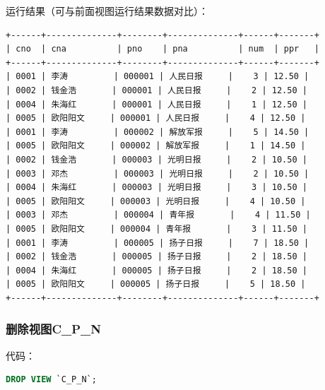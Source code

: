 \documentclass[hyperref,UTF8,c5size]{ctexart}
\begin{document}
            运行结果（可与前面视图运行结果数据对比）：
            \begin{lstlisting}
+------+--------------+--------+--------------+------+-------+
| cno  | cna          | pno    | pna          | num  | ppr   |
+------+--------------+--------+--------------+------+-------+
| 0001 | 李涛         | 000001 | 人民日报     |    3 | 12.50 |
| 0002 | 钱金浩       | 000001 | 人民日报     |    2 | 12.50 |
| 0004 | 朱海红       | 000001 | 人民日报     |    1 | 12.50 |
| 0005 | 欧阳阳文     | 000001 | 人民日报     |    4 | 12.50 |
| 0001 | 李涛         | 000002 | 解放军报     |    5 | 14.50 |
| 0005 | 欧阳阳文     | 000002 | 解放军报     |    1 | 14.50 |
| 0002 | 钱金浩       | 000003 | 光明日报     |    2 | 10.50 |
| 0003 | 邓杰         | 000003 | 光明日报     |    2 | 10.50 |
| 0004 | 朱海红       | 000003 | 光明日报     |    3 | 10.50 |
| 0005 | 欧阳阳文     | 000003 | 光明日报     |    4 | 10.50 |
| 0003 | 邓杰         | 000004 | 青年报       |    4 | 11.50 |
| 0005 | 欧阳阳文     | 000004 | 青年报       |    3 | 11.50 |
| 0001 | 李涛         | 000005 | 扬子日报     |    7 | 18.50 |
| 0002 | 钱金浩       | 000005 | 扬子日报     |    2 | 18.50 |
| 0004 | 朱海红       | 000005 | 扬子日报     |    2 | 18.50 |
| 0005 | 欧阳阳文     | 000005 | 扬子日报     |    5 | 18.50 |
+------+--------------+--------+--------------+------+-------+
            \end{lstlisting}

        \subsubsection{删除视图C\_P\_N}

            代码：
            \begin{lstlisting}[language=SQL]
DROP VIEW `C_P_N`;
            \end{lstlisting}
\end{document}
